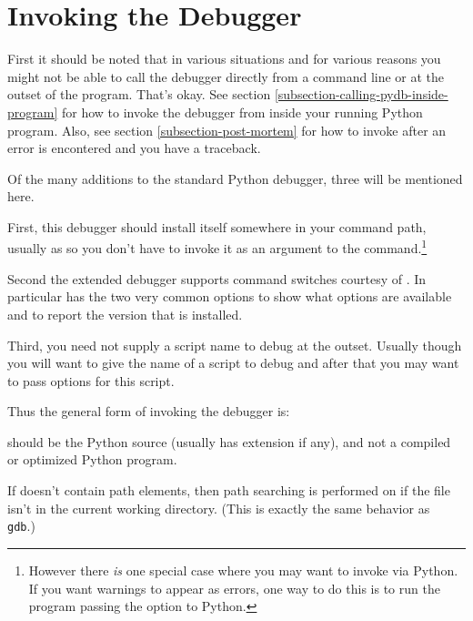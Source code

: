 \section{Invoking the Debugger \label{pydb-invocation}}

First it should be noted that in various situations and for various
reasons you might not be able to call the debugger directly from a
command line or at the outset of the program. That's okay. See section
\ref{subsection-calling-pydb-inside-program} for how to invoke the
debugger from inside your running Python program. Also, see section
\ref{subsection-post-mortem} for how to invoke after an error is
encontered and you have a traceback.

Of the many additions to the standard Python debugger,
 three
will be mentioned here.

First, this debugger should install itself somewhere in your command
path, usually as  so you don't have to invoke it as an
argument to the  command.\footnote{However there
\emph{is} one special case where you may want to invoke via Python. If
you want warnings to appear as errors, one way to do this is
to run the  program passing the  option to
Python.}

Second the extended debugger supports command switches courtesy of
.
In particular  has the two very common options
 to show what options are available and 
to report the version that is installed. 

Third, you need not supply a script name to debug at the
outset. Usually though you will want to give the name of a script to
debug and after that you may want to pass options for this script.

Thus the general form of invoking the debugger is:

 

 should be the Python source (usually has extension
 if any), and not a compiled or optimized Python program.

If  doesn't contain path elements, then path
searching is performed on  if the file isn't in the
current working directory. (This is exactly the same behavior as {\tt
gdb}.)


